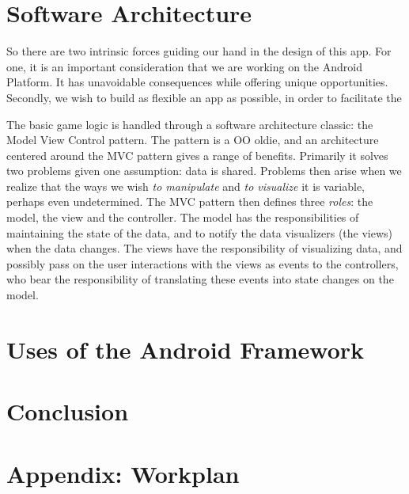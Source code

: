 \documentclass[a4paper, 12pt]{article}
\begin{document}
\section{Software Architecture}

So there are two intrinsic forces guiding our hand in the design of
this app. For one, it is an important consideration that we are
working on the Android Platform. It has unavoidable consequences while
offering unique opportunities. Secondly, we wish to build as flexible
an app as possible, in order to facilitate the 

The basic game logic is handled through a software architecture
classic: the Model View Control pattern. The pattern is a OO oldie,
and an architecture centered around the MVC pattern gives a range of
benefits. Primarily it solves two problems given one assumption: data
is shared. Problems then arise when we realize that the ways we wish
\emph{to manipulate} and \emph{to visualize} it is variable, perhaps
even undetermined. The MVC pattern then defines three \emph{roles}:
the model, the view and the controller. The model has the
responsibilities of maintaining the state of the data, and to notify
the data visualizers (the views) when the data changes. The views have
the responsibility of visualizing data, and possibly pass on the user
interactions with the views as events to the controllers, who bear the
responsibility of translating these events into state changes on the
model.






\section{Uses of the Android Framework}

\section{Conclusion}

\newpage
\section{Appendix: Workplan}
\end{document}

